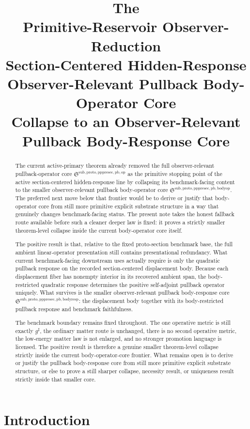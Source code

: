 \documentclass[11pt]{article}
\title{\textbf{The \TheoryName{}}\\[0.4em]
\large Primitive-Reservoir Observer-Reduction\\
\large Section-Centered Hidden-Response\\
\large Observer-Relevant Pullback Body-Operator Core\\
\large Collapse to an Observer-Relevant Pullback Body-Response Core}
\author{}
\date{}
\newcommand{\CompletedMetric}{g^{\sharp}}
\newcommand{\PullbackOperatorCore}{\mathfrak S^{\mathrm{sub,proto,pppresec,pb,op}}}
\newcommand{\PullbackBodyOperatorCore}{\mathfrak S^{\mathrm{sub,proto,pppresec,pb,bodyop}}}
\newcommand{\PullbackBodyResponseCore}{\mathfrak S^{\mathrm{sub,proto,pppresec,pb,bodyresp}}}
\begin{document}
\maketitle

\begin{abstract}
The current active-primary theorem already removed the full observer-relevant pullback-operator core \(\PullbackOperatorCore\) as the primitive stopping point of the active section-centered hidden-response line by collapsing its benchmark-facing content to the smaller observer-relevant pullback body-operator core \(\PullbackBodyOperatorCore\). The preferred next move below that frontier would be to derive or justify that body-operator core from still more primitive explicit substrate structure in a way that genuinely changes benchmark-facing status. The present note takes the honest fallback route available before such a cleaner deeper law is fixed: it proves a strictly smaller theorem-level collapse inside the current body-operator core itself.

The positive result is that, relative to the fixed proto-section benchmark base, the full ambient linear-operator presentation still contains presentational redundancy. What current benchmark-facing downstream uses actually require is only the quadratic pullback response on the recorded section-centered displacement body. Because each displacement fiber has nonempty interior in its recovered ambient span, the body-restricted quadratic response determines the positive self-adjoint pullback operator uniquely. What survives is the smaller observer-relevant pullback body-response core \(\PullbackBodyResponseCore\): the displacement body together with its body-restricted pullback response and benchmark faithfulness.

The benchmark boundary remains fixed throughout. The one operative metric is still exactly \(\CompletedMetric\), the ordinary matter route is unchanged, there is no second operative metric, the low-energy matter law is not enlarged, and no stronger promotion language is licensed. The positive result is therefore a genuine smaller theorem-level collapse strictly inside the current body-operator-core frontier. What remains open is to derive or justify the pullback body-response core from still more primitive explicit substrate structure, or else to prove a still sharper collapse, necessity result, or uniqueness result strictly inside that smaller core.
\end{abstract}

\section{Introduction}
\end{document}
